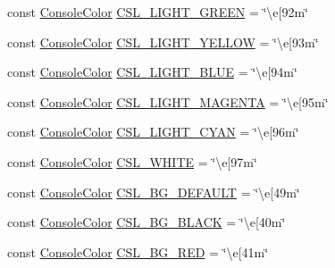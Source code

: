 \begin{DoxyCompactItemize}
const \mbox{\hyperlink{namespaceo_a_a747e07c1977a29f3e1d38683043ec927}{Console\+Color}} \mbox{\hyperlink{namespaceo_a_a1eec5f473ab01766dec3cce307097dad}{C\+S\+L\+\_\+\+L\+I\+G\+H\+T\+\_\+\+G\+R\+E\+EN}} = \char`\"{}\textbackslash{}e\mbox{[}92m\char`\"{}
\item 
const \mbox{\hyperlink{namespaceo_a_a747e07c1977a29f3e1d38683043ec927}{Console\+Color}} \mbox{\hyperlink{namespaceo_a_aef3320de6afc2fb8af2200abfa71ebb4}{C\+S\+L\+\_\+\+L\+I\+G\+H\+T\+\_\+\+Y\+E\+L\+L\+OW}} = \char`\"{}\textbackslash{}e\mbox{[}93m\char`\"{}
\item 
const \mbox{\hyperlink{namespaceo_a_a747e07c1977a29f3e1d38683043ec927}{Console\+Color}} \mbox{\hyperlink{namespaceo_a_a91f9a3ce5e98dcb8b93334c19d8f5728}{C\+S\+L\+\_\+\+L\+I\+G\+H\+T\+\_\+\+B\+L\+UE}} = \char`\"{}\textbackslash{}e\mbox{[}94m\char`\"{}
\item 
const \mbox{\hyperlink{namespaceo_a_a747e07c1977a29f3e1d38683043ec927}{Console\+Color}} \mbox{\hyperlink{namespaceo_a_ae45cea4233a991675350e0717834cfb3}{C\+S\+L\+\_\+\+L\+I\+G\+H\+T\+\_\+\+M\+A\+G\+E\+N\+TA}} = \char`\"{}\textbackslash{}e\mbox{[}95m\char`\"{}
\item 
const \mbox{\hyperlink{namespaceo_a_a747e07c1977a29f3e1d38683043ec927}{Console\+Color}} \mbox{\hyperlink{namespaceo_a_ac7a55b70abf88c40810622eb3930c355}{C\+S\+L\+\_\+\+L\+I\+G\+H\+T\+\_\+\+C\+Y\+AN}} = \char`\"{}\textbackslash{}e\mbox{[}96m\char`\"{}
\item 
const \mbox{\hyperlink{namespaceo_a_a747e07c1977a29f3e1d38683043ec927}{Console\+Color}} \mbox{\hyperlink{namespaceo_a_a4afb55957ed6dcda70e81d6dd8f07885}{C\+S\+L\+\_\+\+W\+H\+I\+TE}} = \char`\"{}\textbackslash{}e\mbox{[}97m\char`\"{}
\item 
const \mbox{\hyperlink{namespaceo_a_a747e07c1977a29f3e1d38683043ec927}{Console\+Color}} \mbox{\hyperlink{namespaceo_a_a1194d7a908066e54be308d301fd0e23b}{C\+S\+L\+\_\+\+B\+G\+\_\+\+D\+E\+F\+A\+U\+LT}} = \char`\"{}\textbackslash{}e\mbox{[}49m\char`\"{}
\item 
const \mbox{\hyperlink{namespaceo_a_a747e07c1977a29f3e1d38683043ec927}{Console\+Color}} \mbox{\hyperlink{namespaceo_a_a8af7010d7cb90b7ac0020d2abd5ea322}{C\+S\+L\+\_\+\+B\+G\+\_\+\+B\+L\+A\+CK}} = \char`\"{}\textbackslash{}e\mbox{[}40m\char`\"{}
\item 
const \mbox{\hyperlink{namespaceo_a_a747e07c1977a29f3e1d38683043ec927}{Console\+Color}} \mbox{\hyperlink{namespaceo_a_a96ed5b2f5308a89190bc177122875b69}{C\+S\+L\+\_\+\+B\+G\+\_\+\+R\+ED}} = \char`\"{}\textbackslash{}e\mbox{[}41m\char`\"{}

\end{DoxyCompactItemize}
